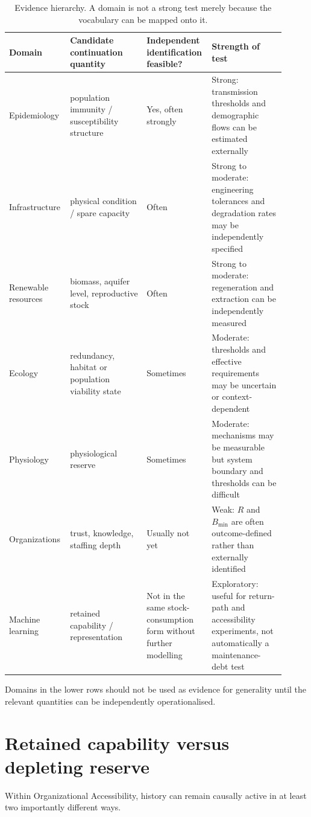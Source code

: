\documentclass[11pt,a4paper]{article}
\begin{document}
\begin{table}[htbp]
\centering
\small
\begin{tabular}{p{0.18\linewidth}p{0.27\linewidth}p{0.20\linewidth}p{0.26\linewidth}}
\toprule
Domain & Candidate continuation quantity & Independent identification feasible? & Strength of test \\
\midrule
Epidemiology & population immunity / susceptibility structure & Yes, often strongly & Strong: transmission thresholds and demographic flows can be estimated externally \\
Infrastructure & physical condition / spare capacity & Often & Strong to moderate: engineering tolerances and degradation rates may be independently specified \\
Renewable resources & biomass, aquifer level, reproductive stock & Often & Strong to moderate: regeneration and extraction can be independently measured \\
Ecology & redundancy, habitat or population viability state & Sometimes & Moderate: thresholds and effective requirements may be uncertain or context-dependent \\
Physiology & physiological reserve & Sometimes & Moderate: mechanisms may be measurable but system boundary and thresholds can be difficult \\
Organizations & trust, knowledge, staffing depth & Usually not yet & Weak: $R$ and $B_{\min}$ are often outcome-defined rather than externally identified \\
Machine learning & retained capability / representation & Not in the same stock-consumption form without further modelling & Exploratory: useful for return-path and accessibility experiments, not automatically a maintenance-debt test \\
\bottomrule
\end{tabular}
\caption{Evidence hierarchy. A domain is not a strong test merely because the vocabulary can be mapped onto it.}
\label{tab:evidence-hierarchy}
\end{table}

Domains in the lower rows should not be used as evidence for generality until the relevant quantities can be independently operationalised.

\section{Retained capability versus depleting reserve}

Within Organizational Accessibility, history can remain causally active in at least two importantly different ways.
\end{document}

